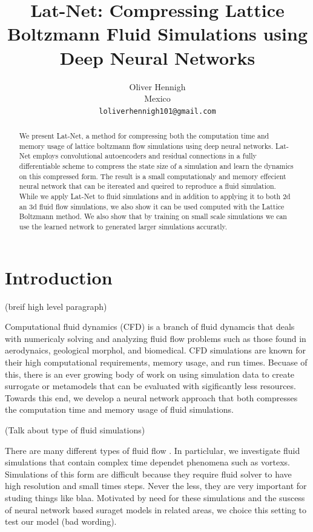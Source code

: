 \documentclass{article}
\title{Lat-Net: Compressing Lattice Boltzmann Fluid Simulations using Deep Neural Networks}
\author{
  Oliver Hennigh \\
  Mexico \\
  \texttt{loliverhennigh101@gmail.com} \\
}
\begin{document}

\maketitle

\begin{abstract}
We present Lat-Net, a method for compressing both the computation time and memory usage of lattice boltzmann flow simulations using deep neural networks. Lat-Net employs convolutional autoencoders and residual connections in a fully differentiable scheme to compress the state size of a simulation and learn the dynamics on this compressed form. The result is a small computationaly and memory effecient neural network that can be itereated and queired to reproduce a fluid simulation. While we apply Lat-Net to fluid simulations   and in addition to applying it to both 2d an 3d fluid flow simulations, we also show it can be used  computed with the Lattice Boltzmann method. We also show that by training on small scale simulations we can use the learned network to generated larger simulations accuratly.

\end{abstract}

\section{Introduction}

(breif high level paragraph)

Computational fluid dynamics (CFD) is a branch of fluid dynamcis that deals with numericaly solving and analyzing fluid flow problems such as those found in aerodynaics, geological morphol, and biomedical. CFD simulations are known for their high computational requirements, memory usage, and run times. Becuase of this, there is an ever growing body of work on using simulation data to create surrogate or metamodels that can be evaluated with sigificantly less resources. Towards this end, we develop a neural network approach that both compresses the computation time and memory usage of fluid simulations.

(Talk about type of fluid simulations)

There are many different types of fluid flow . In particlular, we investigate fluid simulations that contain complex time dependet phenomena such as vortexs. Simulations of this form are difficult because they require fluid solver to have high resolution and small times steps. Never the less, they are very important for studing things like blaa. Motivated by need for these simulations and the suscess of neural network based suraget models in related areas, we choice this setting to test our model (bad wording).
\end{document}
